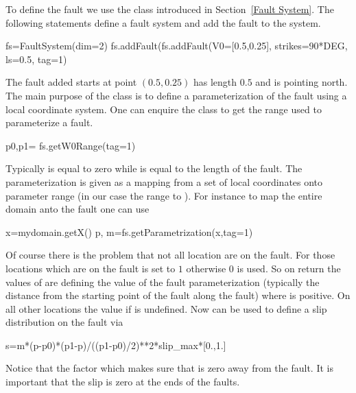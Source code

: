 To define the fault we use the  class introduced in Section~\ref{Fault System}. 
The following statements define a fault system  and add the fault  
to the system.
\begin{python}
fs=FaultSystem(dim=2)
fs.addFault(fs.addFault(V0=[0.5,0.25], strikes=90*DEG, ls=0.5, tag=1)
\end{python}
The fault added starts at point $(0.5,0.25)$ has length $0.5$ and is pointing north.
The main purpose of the  class is to define a parameterization
of the fault using a local coordinate system. One can enquire the class
to get the range used to parameterize a fault.
\begin{python}
p0,p1= fs.getW0Range(tag=1)
\end{python}
Typically  is equal to zero while  is equal to the length of the fault. The parameterization
is given as a mapping from a set of local coordinates onto parameter range (in our case 
the range  to ). For instance to map the entire domain  anto the fault 
one can use
\begin{python}
x=mydomain.getX()
p, m=fs.getParametrization(x,tag=1)
\end{python}
Of course there is the problem that not all location are on the fault. For those locations which are on the 
fault  is set to $1$ otherwise $0$ is used. So on return the values of  are defining
the value of the fault parameterization (typically the distance from the starting point of the fault along the fault) 
where  is positive. On all other locations the value if  is undefined. Now  can
be used to define a slip distribution on the fault via
\begin{python}
s=m*(p-p0)*(p1-p)/((p1-p0)/2)**2*slip_max*[0.,1.]
\end{python}
Notice that the factor  which makes sure that  is zero away from the fault. It is important
that the slip is zero at the ends of the faults.


